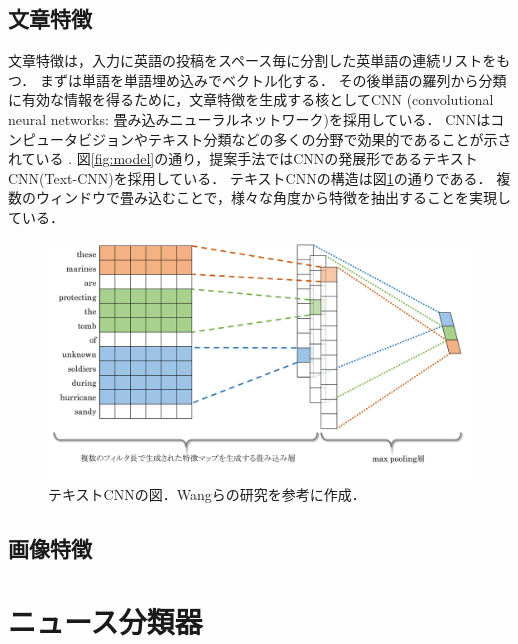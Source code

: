 \subsection{文章特徴}
文章特徴は，入力に英語の投稿をスペース毎に分割した英単語の連続リストをもつ．
まずは単語を単語埋め込みでベクトル化する．
その後単語の羅列から分類に有効な情報を得るために，文章特徴を生成する核としてCNN
(convolutional neural networks: 畳み込みニューラルネットワーク)を採用している．
CNNはコンピュータビジョンやテキスト分類などの多くの分野で効果的であることが示されている
\cite{collobert2011natural,kalchbrenner2014convolutional}.
図\ref{fig:model}の通り，提案手法ではCNNの発展形であるテキストCNN(Text-CNN)\cite{kim2014convolutional}を採用している．
テキストCNNの構造は図\ref{fig:text-cnn}の通りである．
複数のウィンドウで畳み込むことで，様々な角度から特徴を抽出することを実現している．
\begin{figure}[h]
    \centering
    \includegraphics[width=\linewidth]{images/text-cnn.pdf}
    \caption{テキストCNNの図．Wangらの研究\cite{wang2018eann}を参考に作成．}
    \label{fig:text-cnn}
\end{figure}
%
\subsection{画像特徴}
%
\section{ニュース分類器}
%




%
%
\newpage
%
%
%
%
%
%
%
%
%
%
% 